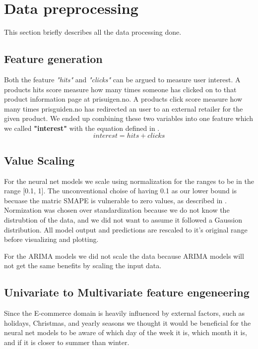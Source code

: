\section{Data preprocessing}
\label{section:Data:Preprocessing}
This section briefly describes all the data processing done.

\subsection{Feature generation}
Both the feature \textit{"hits"} and \textit{"clicks"} can be argued to measure
user interest. A products hits score measure how many times someone has clicked
on to that product information page at prisuigen.no. A products click score measure
how many times prisguiden.no has redirected an user to an external retailer for the given product.
We ended up combining these two variables into one feature which we called \textbf{"interest"}
with the equation defined in .
\begin{equation}
  interest = hits + clicks
  \label{eq:interest}
\end{equation}

\subsection{Value Scaling}
For the neural net models we scale using normalization for the ranges to be in the range [0.1, 1].
The unconventional choise of having 0.1 as our lower bound is becuase the matric SMAPE
is vulnerable to zero values, as described in .
Normization was chosen over standardization because we do not know the distrubtion
of the data, and we did not want to assume it followed a Gaussion distribution.
All model output and predictions are rescaled to it's original range before
visualizing and plotting.

For the ARIMA models we did not scale the data because ARIMA models will not
get the same benefits by scaling the input data.


\subsection{Univariate to Multivariate feature engeneering}
Since the E-commerce domain is heavily influenced by external factors, such as
holidays, Christmas, and yearly seasons we thought it would be beneficial
for the neural net models to be aware of which day of the week it is,
which month it is, and if it is closer to summer than winter.

